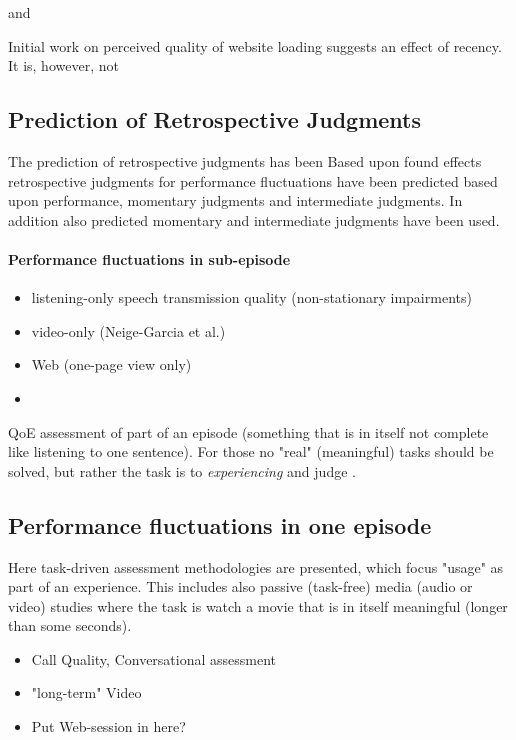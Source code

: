 and \citet{hands_recency_2001}
\cite{rimac-drlje_influence_2009}


\cite{garcia_accuracy_2015}
\cite{masry_cvqe:_2003}
\cite{seufert_pool_2013}
\cite{sackl_evaluating_2013}

Initial work on perceived quality of website loading suggests an effect of recency.
It is, however, not 
\cite{sackl_quantifying_2015}
\cite{strohmeier_importance_2013}






\cite{belmudez_call_2013}

\subsection{Prediction of Retrospective Judgments}
The prediction of retrospective judgments has been 
Based upon found effects retrospective judgments for performance fluctuations have been predicted based upon performance, momentary judgments and intermediate judgments.
In addition also predicted momentary and intermediate judgments have been used.

\cite{berger_estimation_2008}
\cite{weiss_modeling_2009}
\cite{belmudez_call_2013}
\cite{garcia_accuracy_2015}
\cite{seufert_pool_2013}
\cite{gros_instantaneous_2001}
\cite{masry_cvqe:_2003}
\cite{rimac-drlje_influence_2009}


\paragraph*{Performance fluctuations in sub-episode}
\begin{itemize}
\item listening-only speech transmission quality (non-stationary impairments)
\item video-only (Neige-Garcia et al.)
\item Web (one-page view only)
\item \cite{hands_recency_2001}
\end{itemize}

\cite{garcia_parametric_2014}


QoE assessment of part of an episode (something that is in itself not complete like listening to one sentence).
For those no "real" (meaningful) tasks should be solved, but rather the task is to \textit{experiencing} and judge \cite{egger_qoe_2014}.

\subsection{Performance fluctuations in one episode}
Here task-driven assessment methodologies are presented, which focus "usage" as part of an experience.
This includes also passive (task-free) media (audio or video) studies where the task is watch a movie that is in itself meaningful (longer than some seconds).

\begin{itemize}
\item Call Quality, Conversational assessment
\item "long-term" Video
\item Put Web-session in here?
\end{itemize}